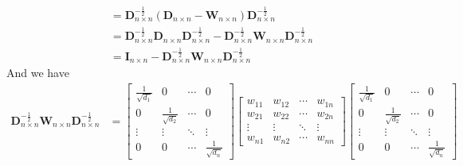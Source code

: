 \documentclass[oneside]{book}
\begin{document}
{{\begin{align}
                &=\mathbf{D}_{n \times n}^{-\frac{1}{2}}(\mathbf{D}_{n \times n}-\mathbf{W}_{n \times n})\mathbf{D}_{n \times n}^{-\frac{1}{2}}\\
                &=\mathbf{D}_{n \times n}^{-\frac{1}{2}}\mathbf{D}_{n \times n}\mathbf{D}_{n \times n}^{-\frac{1}{2}}-\mathbf{D}_{n \times n}^{-\frac{1}{2}}\mathbf{W}_{n \times n}\mathbf{D}_{n \times n}^{-\frac{1}{2}}\\
                &=\mathbf{I}_{n \times n}-\mathbf{D}_{n \times n}^{-\frac{1}{2}}\mathbf{W}_{n \times n}\mathbf{D}_{n \times n}^{-\frac{1}{2}}
        \end{align}
        And we have
        \begin{align}
            \mathbf{D}_{n \times n}^{-\frac{1}{2}}\mathbf{W}_{n \times n}\mathbf{D}_{n \times n}^{-\frac{1}{2}}
                &=
                \begin{bmatrix}
                    \frac{1}{\sqrt{d_{1}}} & 0                      & \cdots & 0\\
                    0                      & \frac{1}{\sqrt{d_{2}}} & \cdots & 0\\
                    \vdots                 & \vdots                 & \ddots & \vdots\\
                    0                      & 0                      & \cdots & \frac{1}{\sqrt{d_{n}}}
                \end{bmatrix}
                \begin{bmatrix}
                    w_{11} & w_{12} & \cdots & w_{1n}\\
                    w_{21} & w_{22} & \cdots & w_{2n}\\
                    \vdots & \vdots & \ddots & \vdots\\
                    w_{n1} & w_{n2} & \cdots & w_{nn}
                \end{bmatrix}
                \begin{bmatrix}
                    \frac{1}{\sqrt{d_{1}}} & 0                      & \cdots & 0\\
                    0                      & \frac{1}{\sqrt{d_{2}}} & \cdots & 0\\
                    \vdots                 & \vdots                 & \ddots & \vdots\\
                    0                      & 0                      & \cdots & \frac{1}{\sqrt{d_{n}}}
                \end{bmatrix}\\

\end{align}}}
\end{document}
